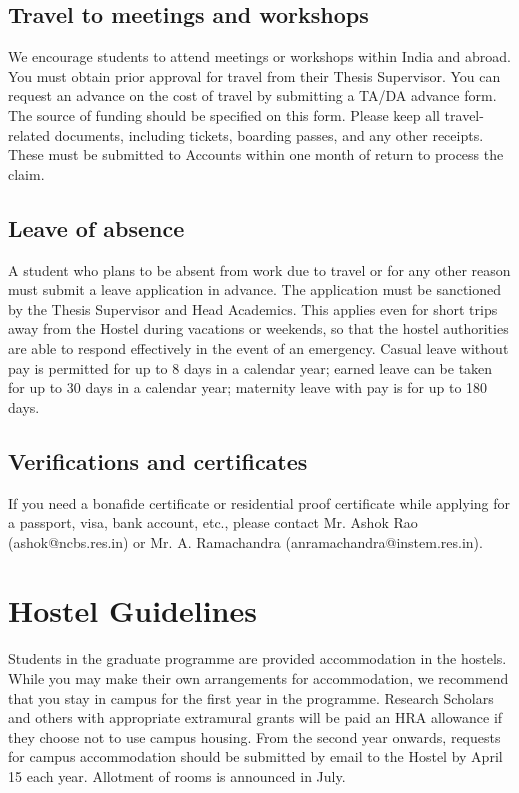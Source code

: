 \documentclass[a4paper]{extarticle}
\begin{document}
\subsection{Travel to meetings and workshops}
We encourage students to attend meetings or
workshops within India and abroad. You must obtain prior approval for travel from their
Thesis Supervisor. You can request an advance on the cost of travel by submitting a TA/DA
advance form. The source of funding should be specified on this form. Please keep all
travel-related documents, including tickets, boarding passes, and any other receipts. These
must be submitted to Accounts within one month of return to process the claim.

\subsection{Leave of absence}
A student who plans to be absent from work due to travel or for any
other reason must submit a leave application in advance. The application must be sanctioned
by the Thesis Supervisor and Head Academics. This applies even for short trips away from
the Hostel during vacations or weekends, so that the hostel authorities are able to respond
effectively in the event of an emergency. Casual leave without pay is permitted for up to 8
days in a calendar year; earned leave can be taken for up to 30 days in a calendar year;
maternity leave with pay is for up to 180 days.

\subsection{Verifications and certificates}
If you need a bonafide certificate or residential proof
certificate while applying for a passport, visa, bank account, etc., please contact Mr. Ashok
Rao (ashok@ncbs.res.in) or Mr. A. Ramachandra (anramachandra@instem.res.in).
	

\section{Hostel Guidelines}
Students in the graduate programme are provided accommodation in the hostels. While you
may make their own arrangements for accommodation, we recommend that you stay in
campus for the first year in the programme. Research Scholars and others with appropriate
extramural grants will be paid an HRA allowance if they choose not to use campus housing.
From the second year onwards, requests for campus accommodation should be submitted by
email to the Hostel by April 15 each year. Allotment of rooms is announced in July.
\end{document}
